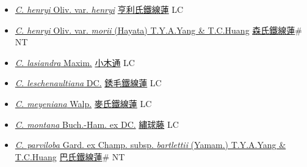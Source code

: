 \begin{itemize}
\begin{itemize}
        \item[] \href{http://www.theplantlist.org/tpl1.1/search?q=Clematis+henryi+var.+henryi}{\textit{C. henryi} Oliv. var. \textit{henryi}}   \href{\detokenize{http://taibnet.sinica.edu.tw/chi/taibnet_species_list.php?T2=亨利氏鐵線蓮&T2_new_value=true&fr=y}}{亨利氏鐵線蓮} LC
        \item[] \href{http://www.theplantlist.org/tpl1.1/search?q=Clematis+henryi+var.+morii}{\textit{C. henryi} Oliv. var. \textit{morii} (Hayata) T.Y.A.Yang \& T.C.Huang}   \href{\detokenize{http://taibnet.sinica.edu.tw/chi/taibnet_species_list.php?T2=森氏鐵線蓮&T2_new_value=true&fr=y}}{森氏鐵線蓮}\# NT
        \item[] \href{http://www.theplantlist.org/tpl1.1/search?q=Clematis+lasiandra}{\textit{C. lasiandra} Maxim.}   \href{\detokenize{http://taibnet.sinica.edu.tw/chi/taibnet_species_list.php?T2=小木通&T2_new_value=true&fr=y}}{小木通} LC
        \item[] \href{http://www.theplantlist.org/tpl1.1/search?q=Clematis+leschenaultiana}{\textit{C. leschenaultiana} DC.}   \href{\detokenize{http://taibnet.sinica.edu.tw/chi/taibnet_species_list.php?T2=銹毛鐵線蓮&T2_new_value=true&fr=y}}{銹毛鐵線蓮} LC
        \item[] \href{http://www.theplantlist.org/tpl1.1/search?q=Clematis+meyeniana}{\textit{C. meyeniana} Walp.}   \href{\detokenize{http://taibnet.sinica.edu.tw/chi/taibnet_species_list.php?T2=麥氏鐵線蓮&T2_new_value=true&fr=y}}{麥氏鐵線蓮} LC
        \item[] \href{http://www.theplantlist.org/tpl1.1/search?q=Clematis+montana}{\textit{C. montana} Buch.-Ham. ex DC.}   \href{\detokenize{http://taibnet.sinica.edu.tw/chi/taibnet_species_list.php?T2=繡球藤&T2_new_value=true&fr=y}}{繡球藤} LC
        \item[] \href{http://www.theplantlist.org/tpl1.1/search?q=Clematis+parviloba+subsp.+bartlettii}{\textit{C. parviloba} Gard. ex Champ. subsp. \textit{bartlettii} (Yamam.) T.Y.A.Yang \& T.C.Huang}   \href{\detokenize{http://taibnet.sinica.edu.tw/chi/taibnet_species_list.php?T2=巴氏鐵線蓮&T2_new_value=true&fr=y}}{巴氏鐵線蓮}\# NT

\end{itemize}
\end{itemize}
